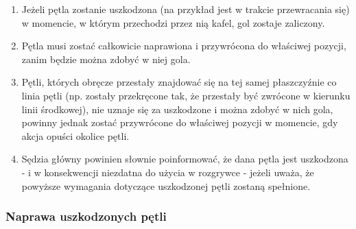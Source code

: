 \documentclass[12pt]{article}
\begin{document}
\begin{enumerate}
\item
    Jeżeli pętla zostanie uszkodzona (na przykład jest w trakcie
  przewracania się) w momencie, w którym przechodzi przez nią kafel, gol
  zostaje zaliczony.
  \item
    Pętla musi zostać całkowicie naprawiona i przywrócona do właściwej
  pozycji, zanim będzie można zdobyć w niej gola.
  \item
    Pętli, których obręcze przestały znajdować się na tej samej
  płaszczyźnie co linia pętli (np. zostały przekręcone tak, że przestały
  być zwrócone w kierunku linii środkowej), nie uznaje się za uszkodzone
  i można zdobyć w nich gola, powinny jednak zostać przywrócone do
  właściwej pozycji w momencie, gdy akcja opuści okolice pętli.
  \item
    Sędzia główny powinien słownie poinformować, że dana pętla jest
  uszkodzona - i w konsekwencji niezdatna do użycia w rozgrywce - jeżeli
  uważa, że powyższe wymagania dotyczące uszkodzonej pętli zostaną
  spełnione.
  \end{enumerate}

\subsubsection{Naprawa uszkodzonych pętli}
\end{document}
